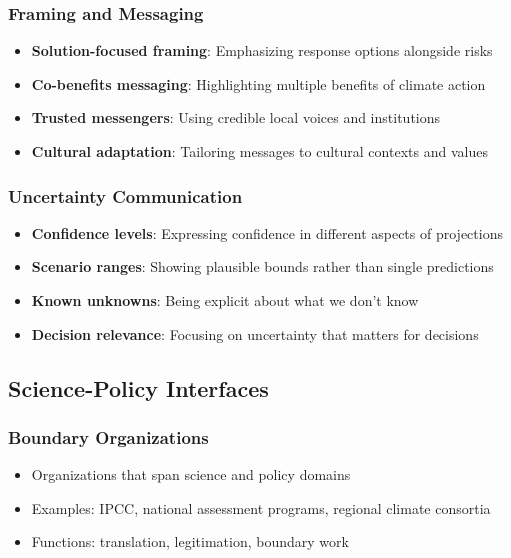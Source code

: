 \documentclass[
  letterpaper,
  DIV=11,
  numbers=noendperiod]{scrreprt}
\providecommand{\tightlist}{%
  \setlength{\itemsep}{0pt}\setlength{\parskip}{0pt}}
\begin{document}
\subsubsection{Framing and Messaging}\label{framing-and-messaging}

\begin{itemize}
\tightlist
\item
  \textbf{Solution-focused framing}: Emphasizing response options
  alongside risks
\item
  \textbf{Co-benefits messaging}: Highlighting multiple benefits of
  climate action
\item
  \textbf{Trusted messengers}: Using credible local voices and
  institutions
\item
  \textbf{Cultural adaptation}: Tailoring messages to cultural contexts
  and values
\end{itemize}

\subsubsection{Uncertainty
Communication}\label{uncertainty-communication}

\begin{itemize}
\tightlist
\item
  \textbf{Confidence levels}: Expressing confidence in different aspects
  of projections
\item
  \textbf{Scenario ranges}: Showing plausible bounds rather than single
  predictions
\item
  \textbf{Known unknowns}: Being explicit about what we don't know
\item
  \textbf{Decision relevance}: Focusing on uncertainty that matters for
  decisions
\end{itemize}

\subsection{Science-Policy Interfaces}\label{science-policy-interfaces}

\subsubsection{Boundary Organizations}\label{boundary-organizations}

\begin{itemize}
\tightlist
\item
  Organizations that span science and policy domains
\item
  Examples: IPCC, national assessment programs, regional climate
  consortia
\item
  Functions: translation, legitimation, boundary work
\end{itemize}
\end{document}
